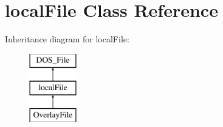 \hypertarget{classlocalFile}{\section{local\-File Class Reference}
\label{classlocalFile}
}
Inheritance diagram for local\-File\-:\begin{figure}[H]
\begin{center}
\leavevmode
\includegraphics[height=3.000000cm]{classlocalFile}
\end{center}
\end{figure}
